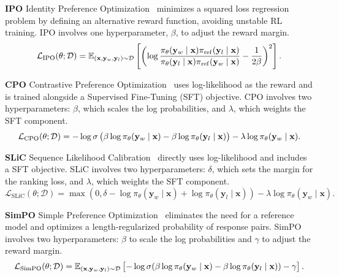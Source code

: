 \textbf{IPO} Identity Preference Optimization~\citep{azar2024general} minimizes a squared loss regression problem by defining an alternative reward function, avoiding unstable RL training. 
IPO involves one hyperparameter, $\beta$, to adjust the reward margin.
$$
\mathcal{L}_{\rm{IPO}}({\theta}; \mathcal{D})=\mathbb{E}_{(\mathbf{x}, \mathbf{y}_w, \mathbf{y}_l)\sim \mathcal{D}}\left[\left (\log \frac{\pi_\theta(\mathbf{y}_w \mid \mathbf{x})\pi_{\mathrm{ref}}(\mathbf{y}_l \mid \mathbf{x})}{\pi_{\theta}(\mathbf{y}_l \mid \mathbf{x} )\pi_{\mathrm{ref}}(\mathbf{y}_w \mid \mathbf{x})}-\frac{1}{2\beta}\right)^{2}\right].
$$

\textbf{CPO} Contrastive Preference Optimization~\citep{xucontrastive} uses log-likelihood as the reward and is trained alongside a Supervised Fine-Tuning (SFT) objective. 
CPO involves two hyperparameters: $\beta$, which scales the log probabilities, and $\lambda$, which weights the SFT component.
$$
\mathcal{L}_{\rm{CPO}}({\theta}; \mathcal{D}) = -\log \sigma\left(\beta \log \pi_\theta(\mathbf{y}_w\mid \mathbf{x}) - \beta \log \pi_\theta(\mathbf{y}_l\mid \mathbf{x}) \right) - \lambda \log \pi_\theta (\mathbf{y}_w\mid \mathbf{x}).
$$


\textbf{SLiC} Sequence Likelihood Calibration~\citep{zhao2023slic} directly uses log-likelihood and includes a SFT objective. 
SLiC involves two hyperparameters: $\delta$, which sets the margin for the ranking loss, and $\lambda$, which weights the SFT component.
$$
\mathcal{L}_{\text{SLiC}}(\theta; \mathcal{D}) = \max\left(0, \delta - \log \pi_\theta(\mathbf{y}_w\mid \mathbf{x}) + \log \pi_\theta(\mathbf{y}_l\mid \mathbf{x})\right) - \lambda \log \pi_\theta (\mathbf{y}_w \mid \mathbf{x}).
$$


\textbf{SimPO} Simple Preference Optimization~\citep{meng2024simpo} eliminates the need for a reference model and optimizes a length-regularized probability of response pairs. 
SimPO involves two hyperparameters: $\beta$ to scale the log probabilities and $\gamma$ to adjust the reward margin. 
$$
\mathcal{L}_{\rm{SimPO}}({\theta}; \mathcal{D})=\mathbb{E}_{(\mathbf{x}, \mathbf{y}_w, \mathbf{y}_l)\sim \mathcal{D}}\left[-\log \sigma(\beta \log {\pi_{\theta}(\mathbf{y}_w \mid \mathbf{x})}-\beta \log {\pi_{\theta}(\mathbf{y}_l \mid \mathbf{x} )})-\gamma \right].
$$


